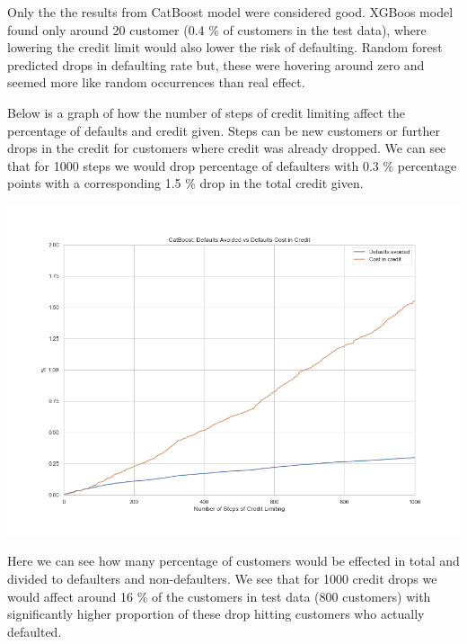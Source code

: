 \documentclass[12pt,a4paper,leqno]{report}
\theoremstyle{plain}
\theoremstyle{definition}
\theoremstyle{remark}
\begin{document}
Only the the results from CatBoost model were considered good. XGBoos model found
only around 20 customer (0.4 \% of customers in the test data), where lowering the
credit limit would also lower the risk of defaulting. Random forest predicted
drops in defaulting rate but, these were hovering around zero and seemed more
like random occurrences than real effect.

Below is a graph of how the number of steps of credit limiting affect
the percentage of defaults and credit given. Steps can be new customers
or further drops in the credit for customers where credit was already dropped.
We can see that for 1000 steps we would drop percentage of defaulters with
0.3 \% percentage points with a corresponding 1.5 \% drop in the total credit
given.

\bigskip
{
    \centering
    \includegraphics[width=\textwidth,height=\textheight,keepaspectratio]{catboost_defaults_vs_costs.png}
    \par
}
\bigskip

Here we can see how many percentage of customers would be effected in total and divided
to defaulters and non-defaulters. We see that for 1000 credit drops we would affect around
16 \% of the customers in test data (800 customers) with significantly higher
proportion of these drop hitting customers who actually defaulted.
\end{document}
